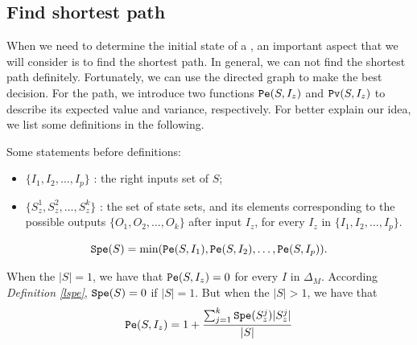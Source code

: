 \subsection{Find shortest path}
When we need to determine the initial state of a \BCN, an important aspect that we will consider is to find the shortest path. In general, we can not find the shortest path definitely.  Fortunately, we can use the directed graph to make the best decision. For the path, we introduce two functions $\Pe(S, I_z)$ and ${\tt Pv}(S, I_z)$ to describe its expected value and variance, respectively. For better explain our idea, we list some definitions in the following.



Some statements before definitions:
\begin{itemize}
  \item $\{I_1,I_2,\ldots, I_p\}$ : the right inputs set of $S$;
  \item $\{S_z^1,S_z^2,\ldots, S_z^k\}$ : the set of state sets, and its elements corresponding to the possible outputs $\{O_1,O_2,\ldots,O_k\}$ after input $I_z$, for every $I_z$ in $\{I_1,I_2,\ldots, I_p\}$.
\end{itemize} 
\begin{definition}[$\Spe(S)$] \label{lspe}
 \[{\tt Spe}(S)= \min({\tt Pe}(S, I_1),{\tt Pe}(S, I_2),\ldots,{\tt Pe}(S, I_p)).\] 
\end{definition}

\begin{definition}[$\Pe(S, I_z)$] 
When the $|S|=1$, we have that
${\tt Pe}(S, I_z)=0$  for every $I$ in $\Delta_M$. According {\em Definition \ref{lspe}}, ${\tt Spe}(S)=0$ if $|S|=1$. But when the $|S|>1$, 
we have that  
\[{\tt Pe}(S, I_z)=1 +\frac{\sum_{j=1}^k {\tt Spe}(S_z^j)|S_z^j|}{ |S|}\] 
\end{definition}


